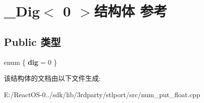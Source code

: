 \hypertarget{struct___dig_3_010_01_4}{}\section{\+\_\+\+Dig$<$ 0 $>$结构体 参考}
\label{struct___dig_3_010_01_4}
\subsection*{Public 类型}
\begin{DoxyCompactItemize}
\item 
\mbox{\label{struct___dig_3_010_01_4_af3b08e50035f77930b542f5cfb2847f3}} 
enum \{ {\bfseries dig} = 0
 \}
\end{DoxyCompactItemize}


该结构体的文档由以下文件生成\+:\begin{DoxyCompactItemize}
\item 
E\+:/\+React\+O\+S-\/0../sdk/lib/3rdparty/stlport/src/num\+\_\+put\+\_\+float.\+cpp\end{DoxyCompactItemize}
